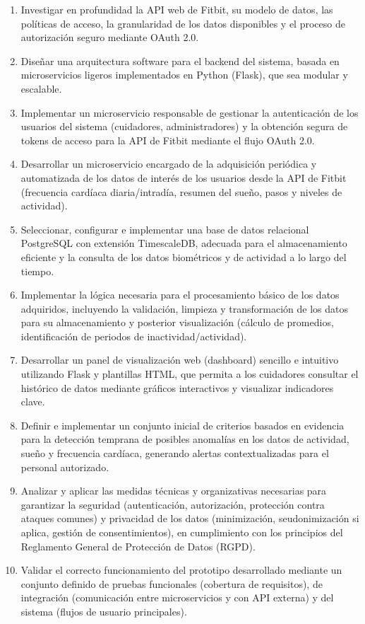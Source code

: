 \begin{enumerate}
    \item Investigar en profundidad la API web de Fitbit\textsuperscript{\textregistered}, su modelo de datos, las políticas de acceso, la granularidad de los datos disponibles y el proceso de autorización seguro mediante OAuth 2.0.
    \item Diseñar una arquitectura software para el backend del sistema, basada en microservicios ligeros implementados en Python (Flask), que sea modular y escalable.
    \item Implementar un microservicio responsable de gestionar la autenticación de los usuarios del sistema (cuidadores, administradores) y la obtención segura de tokens de acceso para la API de Fitbit\textsuperscript{\textregistered} mediante el flujo OAuth 2.0.
    \item Desarrollar un microservicio encargado de la adquisición periódica y automatizada de los datos de interés de los usuarios desde la API de Fitbit\textsuperscript{\textregistered} (frecuencia cardíaca diaria/intradía, resumen del sueño, pasos y niveles de actividad).
    \item Seleccionar, configurar e implementar una base de datos relacional PostgreSQL con extensión TimescaleDB, adecuada para el almacenamiento eficiente y la consulta de los datos biométricos y de actividad a lo largo del tiempo.
    \item Implementar la lógica necesaria para el procesamiento básico de los datos adquiridos, incluyendo la validación, limpieza y transformación de los datos para su almacenamiento y posterior visualización (cálculo de promedios, identificación de periodos de inactividad/actividad).
    \item Desarrollar un panel de visualización web (dashboard) sencillo e intuitivo utilizando Flask y plantillas HTML, que permita a los cuidadores consultar el histórico de datos mediante gráficos interactivos y visualizar indicadores clave.
    \item Definir e implementar un conjunto inicial de criterios basados en evidencia para la detección temprana de posibles anomalías en los datos de actividad, sueño y frecuencia cardíaca, generando alertas contextualizadas para el personal autorizado.
    \item Analizar y aplicar las medidas técnicas y organizativas necesarias para garantizar la seguridad (autenticación, autorización, protección contra ataques comunes) y privacidad de los datos (minimización, seudonimización si aplica, gestión de consentimientos), en cumplimiento con los principios del Reglamento General de Protección de Datos (RGPD).
    \item Validar el correcto funcionamiento del prototipo desarrollado mediante un conjunto definido de pruebas funcionales (cobertura de requisitos), de integración (comunicación entre microservicios y con API externa) y del sistema (flujos de usuario principales).
\end{enumerate}

